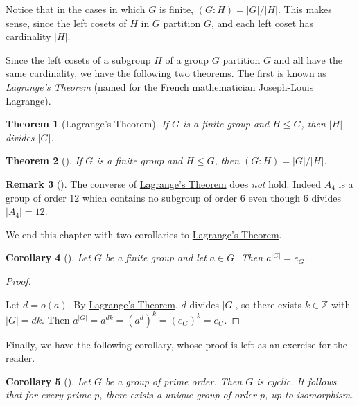 \documentclass[10pt,]{book}
\theoremstyle{plain}
\newtheorem{theorem}{Theorem}[section]
\newtheorem{corollary}[theorem]{Corollary}
\theoremstyle{definition}
\theoremstyle{definition}
\newtheorem{remark}[theorem]{Remark}
\theoremstyle{definition}
\theoremstyle{definition}
\numberwithin{equation}{section}
\def\Z{\mathbb{Z}}
\begin{document}
Notice that in the cases in which \(G\) is finite, \((G:H)=|G|/|H|\). This makes sense, since the left cosets of \(H\) in \(G\) partition \(G\), and each left coset has cardinality \(|H|\).%
\par
Since the left cosets of a subgroup \(H\) of a group \(G\) partition \(G\) and all have the same cardinality, we have the following two theorems. The first is known as \emph{Lagrange's Theorem} (named for the French mathematician Joseph-Louis Lagrange).%
\begin{theorem}[{Lagrange's Theorem}]\label{lagrange}
If \(G\) is a finite group and \(H\leq G\), then \(|H|\) divides \(|G|\).%
\end{theorem}
\begin{theorem}[{}]\label{indexfin}
If \(G\) is a finite group and \(H\leq G\), then \((G:H)=|G|/|H|\).%
\end{theorem}
\begin{remark}[]\label{remark-41}
The converse of \hyperref[lagrange]{Lagrange's Theorem} does \emph{not} hold. Indeed \(A_4\) is a group of order 12 which contains no subgroup of order \(6\) even though \(6\) divides \(|A_4|=12\).%
\end{remark}
We end this chapter with two corollaries to \hyperref[lagrange]{Lagrange's Theorem}.%
\begin{corollary}[{}]\label{corollary-6}
Let \(G\) be a finite group and let \(a\in G\). Then \(a^{|G|}=e_G\).%
\end{corollary}
\begin{proof}\hypertarget{proof-40}{}
Let \(d=o(a)\). By \hyperref[lagrange]{Lagrange's Theorem}, \(d\) divides \(|G|\), so there exists \(k\in \Z\) with \(|G|=dk\). Then \(a^{|G|}=a^{dk}=(a^d)^k=(e_G)^k=e_G.\)%
\end{proof}
Finally, we have the following corollary, whose proof is left as an exercise for the reader.%
\begin{corollary}[{}]\label{pcyc}
Let \(G\) be a group of prime order. Then \(G\) is cyclic. It follows that for every prime \(p\), there exists a unique group of order \(p\), up to isomorphism.%
\end{corollary}
\typeout{************************************************}
\typeout{************************************************}
\end{document}
